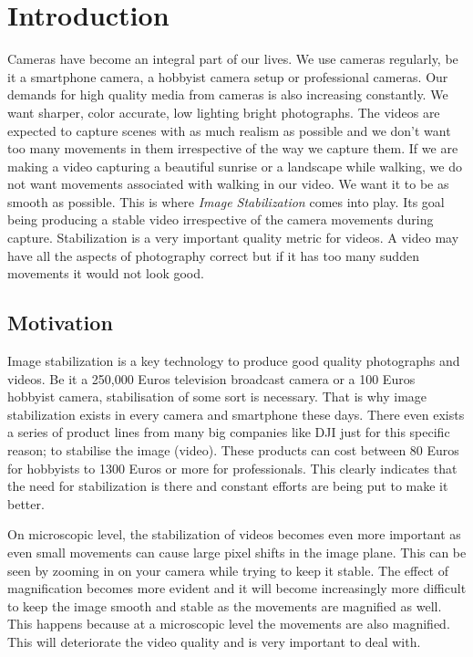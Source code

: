 \chapter{Introduction} \label{chapter_one}

Cameras have become an integral part of our lives. We use cameras regularly, be it a smartphone camera, a hobbyist camera setup or professional cameras. Our demands for high quality media from cameras is also increasing constantly. We want sharper, color accurate, low lighting bright photographs. The videos are expected to capture scenes with as much realism as possible and we don't want too many movements in them irrespective of the way we capture them. If we are making a video capturing a beautiful sunrise or a landscape while walking, we do not want movements associated with walking in our video. We want it to be as smooth as possible. This is where \textit{Image Stabilization} comes into play. Its goal being producing a stable video irrespective of the camera movements during capture. Stabilization is a very important quality metric for videos. A video may have all the aspects of photography correct but if it has too many sudden movements it would not look good.

\section{Motivation}

Image stabilization is a key technology to produce  good quality photographs and videos. Be it a 250,000 Euros television broadcast camera or a 100 Euros hobbyist camera, stabilisation of some sort is necessary. That is why image stabilization exists in every camera and smartphone these days. There even exists a series of product lines from many big companies like DJI just for this specific reason; to stabilise the image (video). These products can cost between 80 Euros for hobbyists to 1300 Euros or more for professionals. This clearly indicates that the need for stabilization is there and constant efforts are being put to make it better.

On microscopic level, the stabilization of videos becomes even more important as even small movements can cause large pixel shifts in the image plane. This can be seen by zooming in on your camera while trying to keep it stable. The effect of magnification becomes more evident and it will become increasingly more difficult to keep the image smooth and stable as the movements are magnified as well. This happens because at a microscopic level the movements are also magnified. This will deteriorate the video quality and is very important to deal with. 

